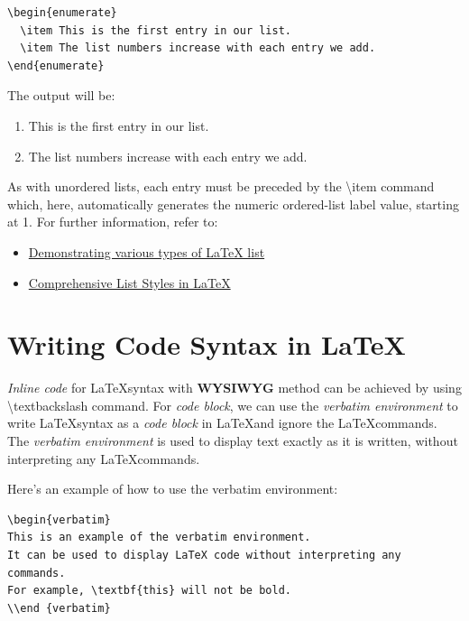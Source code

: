 \documentclass[12pt, letterpaper]{article}
\begin{document}
\begin{verbatim}
\begin{enumerate}
  \item This is the first entry in our list.
  \item The list numbers increase with each entry we add.
\end{enumerate}
\end{verbatim}

The output will be:

\begin{enumerate}
  \item This is the first entry in our list.
  \item The list numbers increase with each entry we add.
\end{enumerate}

As with unordered lists, each entry must be preceded by the \textbackslash item command which, here, automatically generates the numeric ordered-list label value, starting at 1. For further information, refer to:

\begin{itemize}
    \item \href{https://www.overleaf.com/project/new/template/25521?id=107987258&templateName=Demonstrating+various+types+of+LaTeX+list&latexEngine=pdflatex&texImage=texlive-full%3A2022.1&mainFile=}{Demonstrating various types of LaTeX list}
    \item \href{https://www.overleaf.com/learn/latex/Lists}{Comprehensive List Styles in \LaTeX}
\end{itemize}

\section{Writing Code Syntax in \LaTeX}

\textit{Inline code} for \LaTeX syntax with \textbf{WYSIWYG} method can be achieved by using \textbackslash textbackslash command. For \textit{code block}, we can use the \textit{verbatim environment} to write \LaTeX syntax as a \textit{code block} in \LaTeX and ignore the \LaTeX commands. The \textit{verbatim environment} is used to display text exactly as it is written, without interpreting any \LaTeX commands.

Here's an example of how to use the verbatim environment:

\begin{verbatim}
\begin{verbatim}
This is an example of the verbatim environment.
It can be used to display LaTeX code without interpreting any
commands.
For example, \textbf{this} will not be bold.
\\end {verbatim}
\end{verbatim}
\end{document}
